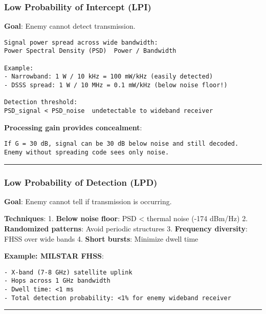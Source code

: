 \subsubsection{Low Probability of Intercept
(LPI)}\label{low-probability-of-intercept-lpi}

\textbf{Goal}: Enemy cannot detect transmission.

\begin{verbatim}
Signal power spread across wide bandwidth:
Power Spectral Density (PSD)  Power / Bandwidth

Example:
- Narrowband: 1 W / 10 kHz = 100 mW/kHz (easily detected)
- DSSS spread: 1 W / 10 MHz = 0.1 mW/kHz (below noise floor!)

Detection threshold:
PSD_signal < PSD_noise  undetectable to wideband receiver
\end{verbatim}

\textbf{Processing gain provides concealment}:

\begin{verbatim}
If G = 30 dB, signal can be 30 dB below noise and still decoded.
Enemy without spreading code sees only noise.
\end{verbatim}

\begin{center}\rule{0.5\linewidth}{0.5pt}\end{center}

\subsubsection{Low Probability of Detection
(LPD)}\label{low-probability-of-detection-lpd}

\textbf{Goal}: Enemy cannot tell if transmission is occurring.

\textbf{Techniques}: 1. \textbf{Below noise floor}: PSD \textless{}
thermal noise (-174 dBm/Hz) 2. \textbf{Randomized patterns}: Avoid
periodic structures 3. \textbf{Frequency diversity}: FHSS over wide
bands 4. \textbf{Short bursts}: Minimize dwell time

\textbf{Example: MILSTAR FHSS}:

\begin{verbatim}
- X-band (7-8 GHz) satellite uplink
- Hops across 1 GHz bandwidth
- Dwell time: <1 ms
- Total detection probability: <1% for enemy wideband receiver
\end{verbatim}

\begin{center}\rule{0.5\linewidth}{0.5pt}\end{center}

